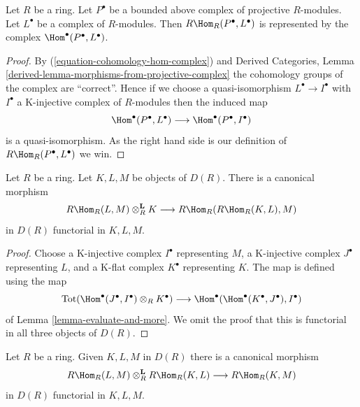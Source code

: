 \begin{lemma}
\label{lemma-RHom-out-of-projective}
Let $R$ be a ring. Let $P^\bullet$ be a bounded above complex
of projective $R$-modules. Let $L^\bullet$ be a complex of $R$-modules.
Then $R\Hom_R(P^\bullet, L^\bullet)$ is represented by the complex
$\Hom^\bullet(P^\bullet, L^\bullet)$.
\end{lemma}

\begin{proof}
By (\ref{equation-cohomology-hom-complex}) and
Derived Categories, Lemma \ref{derived-lemma-morphisms-from-projective-complex}
the cohomology groups of the complex are ``correct''.
Hence if we choose a quasi-isomorphism $L^\bullet \to I^\bullet$
with $I^\bullet$ a K-injective complex of $R$-modules
then the induced map
$$
\Hom^\bullet(P^\bullet, L^\bullet)
\longrightarrow
\Hom^\bullet(P^\bullet, I^\bullet)
$$
is a quasi-isomorphism. As the right hand side is our definition
of $R\Hom_R(P^\bullet, L^\bullet)$ we win.
\end{proof}

\begin{lemma}
\label{lemma-internal-hom-evaluate}
Let $R$ be a ring. Let $K, L, M$ be objects of $D(R)$.
There is a canonical morphism
$$
R\Hom_R(L, M) \otimes_R^\mathbf{L} K
\longrightarrow
R\Hom_R(R\Hom_R(K, L), M)
$$
in $D(R)$ functorial in $K, L, M$.
\end{lemma}

\begin{proof}
Choose
a K-injective complex $I^\bullet$ representing $M$,
a K-injective complex $J^\bullet$ representing $L$, and
a K-flat complex $K^\bullet$ representing $K$.
The map is defined using the map
$$
\text{Tot}(\Hom^\bullet(J^\bullet, I^\bullet) \otimes_R K^\bullet)
\longrightarrow
\Hom^\bullet(\Hom^\bullet(K^\bullet, J^\bullet), I^\bullet)
$$
of Lemma \ref{lemma-evaluate-and-more}. We omit the proof that
this is functorial in all three objects of $D(R)$.
\end{proof}

\begin{lemma}
\label{lemma-internal-hom-composition}
Let $R$ be a ring. Given $K, L, M$ in $D(R)$ there is a canonical morphism
$$
R\Hom_R(L, M) \otimes_R^\mathbf{L} R\Hom_R(K, L) \longrightarrow R\Hom_R(K, M)
$$
in $D(R)$ functorial in $K, L, M$.
\end{lemma}

